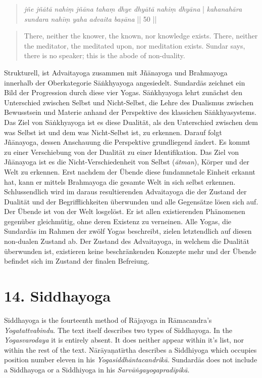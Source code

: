 \begin{quote}
\textit{jñe jñātā nahiṃ jñāna tahaṃ dhye dhyātā nahiṃ dhyāna} |
\textit{kahanahāra sundara nahīṃ yaha advaita baṣāna} || 50 || 
\end{quote}
\begin{quote}
There, neither the knower, the known, nor knowledge exists. There, neither the meditator, the meditated upon, nor meditation exists. Sundar says, there is no speaker; this is the abode of non-duality.
\end{quote}

Strukturell, ist Advaitayoga zusammen mit Jñānayoga und Brahmayoga innerhalb der Oberkategorie Sāṅkhyayoga angesiedelt. Sundardās zeichnet ein Bild der Progression durch diese vier Yogas. Sāṅkhyayoga lehrt zunächst den Unterschied zwischen Selbst und Nicht-Selbst, die Lehre des Dualismus zwischen Bewusstsein und Materie anhand der Perspektive des klassichen Sāṅkhyasystems. Das Ziel von Sāṅkhyayoga ist es diese Dualität, als den Unterschied zwischen dem was Selbst ist und dem was Nicht-Selbst ist, zu erkennen. Darauf folgt Jñānayoga, dessen Anschauung die Perspektive grundliegend ändert. Es kommt zu einer Verschiebung von der Dualität zu einer Identifikation. Das Ziel von Jñānayoga ist es die Nicht-Verschiedenheit von Selbst (\textit{ātman}), Körper und der Welt zu erkennen. Erst nachdem der Übende diese fundamnetale Einheit erkannt hat, kann er mittels Brahmayoga die gesamte Welt in sich selbst erkennen. Schlussendlich wird im daraus resultierenden Advaitayoga die der Zustand der Dualität und der Begrifflichkeiten überwunden und alle Gegensätze lösen sich auf. Der Übende ist von der Welt losgelöst. Er ist allen existierenden Phänomenen gegenüber gleichmütig, ohne deren Existenz zu verneinen. Alle Yogas, die Sundardās im Rahmen der zwölf Yogas beschreibt, zielen letztendlich auf diesen non-dualen Zustand ab. Der Zustand des Advaitayoga, in welchem die Dualität überwunden ist, existieren keine beschränkenden Konzepte mehr und der Übende befindet sich im Zustand der finalen Befreiung.  
\newpage
\section{14. Siddhayoga}
\label{siddhayogaintro}

Siddhayoga is the fourteenth method of Rājayoga in Rāmacandra's \textit{Yogatattvabindu}. The text itself describes two types of Siddhayoga. In the \textit{Yogasvarodaya} it is entirely absent. It does neither appear within it's list, nor within the rest of the text. Nārāyaṇatīrtha describes a Siddhiyoga which occupies position number eleven in his \textit{Yogasiddhāntacandrikā}. Sundardās does not include a Siddhayoga or a Siddhiyoga in his \textit{Sarvāṅgayogapradīpikā}.       

